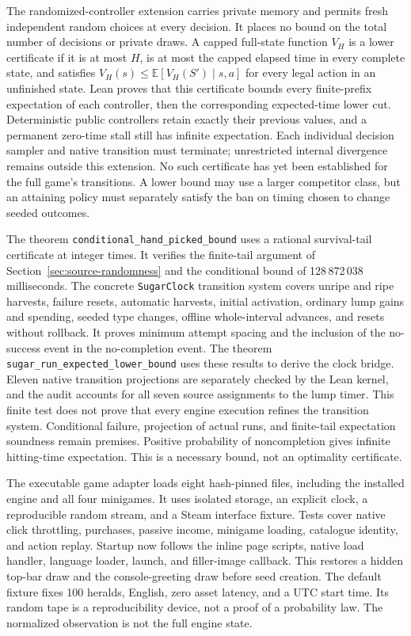 \documentclass[11pt,a4paper]{article}
\numberwithin{equation}{section}
\theoremstyle{definition}
\theoremstyle{remark}
\begin{document}
The randomized-controller extension carries private memory and permits fresh independent random choices at every decision. It places no bound on the total number of decisions or private draws. A capped full-state function $V_H$ is a lower certificate if it is at most $H$, is at most the capped elapsed time in every complete state, and satisfies $V_H(s)\leq\mathbb{E}[V_H(S')\mid s,a]$ for every legal action in an unfinished state. Lean proves that this certificate bounds every finite-prefix expectation of each controller, then the corresponding expected-time lower cut. Deterministic public controllers retain exactly their previous values, and a permanent zero-time stall still has infinite expectation. Each individual decision sampler and native transition must terminate; unrestricted internal divergence remains outside this extension. No such certificate has yet been established for the full game's transitions. A lower bound may use a larger competitor class, but an attaining policy must separately satisfy the ban on timing chosen to change seeded outcomes.

The theorem \texttt{conditional\_hand\_picked\_bound} uses a rational survival-tail certificate at integer times. It verifies the finite-tail argument of Section~\ref{sec:source-randomness} and the conditional bound of 128\,872\,038 milliseconds. The concrete \texttt{SugarClock} transition system covers unripe and ripe harvests, failure resets, automatic harvests, initial activation, ordinary lump gains and spending, seeded type changes, offline whole-interval advances, and resets without rollback. It proves minimum attempt spacing and the inclusion of the no-success event in the no-completion event. The theorem \texttt{sugar\_run\_expected\_lower\_bound} uses these results to derive the clock bridge. Eleven native transition projections are separately checked by the Lean kernel, and the audit accounts for all seven source assignments to the lump timer. This finite test does not prove that every engine execution refines the transition system. Conditional failure, projection of actual runs, and finite-tail expectation soundness remain premises. Positive probability of noncompletion gives infinite hitting-time expectation. This is a necessary bound, not an optimality certificate.

The executable game adapter loads eight hash-pinned files, including the installed engine and all four minigames. It uses isolated storage, an explicit clock, a reproducible random stream, and a Steam interface fixture. Tests cover native click throttling, purchases, passive income, minigame loading, catalogue identity, and action replay. Startup now follows the inline page scripts, native load handler, language loader, launch, and filler-image callback. This restores a hidden top-bar draw and the console-greeting draw before seed creation. The default fixture fixes 100 heralds, English, zero asset latency, and a UTC start time. Its random tape is a reproducibility device, not a proof of a probability law. The normalized observation is not the full engine state.
\end{document}
